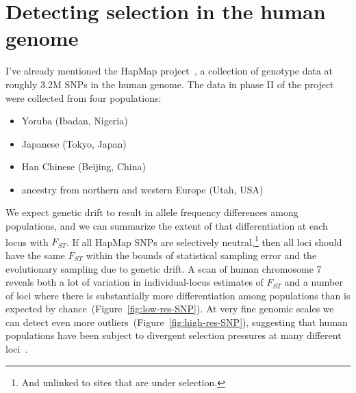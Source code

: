\section*{Detecting selection in the human genome}

I've already mentioned the HapMap project~\cite{HapMap-2007}, a
collection of genotype data at roughly 3.2M SNPs in the human
genome. The data in phase II of the project were collected from four
populations:

\begin{itemize}

\item Yoruba (Ibadan, Nigeria)

\item Japanese (Tokyo, Japan)

\item Han Chinese (Beijing, China)

\item ancestry from northern and western Europe (Utah, USA)

\end{itemize}

We expect genetic drift to result in allele frequency differences
among populations, and we can summarize the extent of that
differentiation at each locus with $F_{ST}$. If all HapMap SNPs are
selectively neutral,\footnote{And unlinked to sites that are under
  selection.} then all loci should have the same $F_{ST}$ within the
bounds of statistical sampling error and the evolutionary sampling due
to genetic drift. A scan of human chromosome 7 reveals both a lot of
variation in individual-locus estimates of $F_{ST}$ and a number of
loci where there is substantially more differentiation among
populations than is expected by
chance~(Figure~\ref{fig:low-res-SNP}). At very fine genomic scales we
can detect even more outliers~(Figure~\ref{fig:high-res-SNP}),
suggesting that human populations have been subject to divergent
selection pressures at many different loci~\cite{Guo-etal-2009}.

